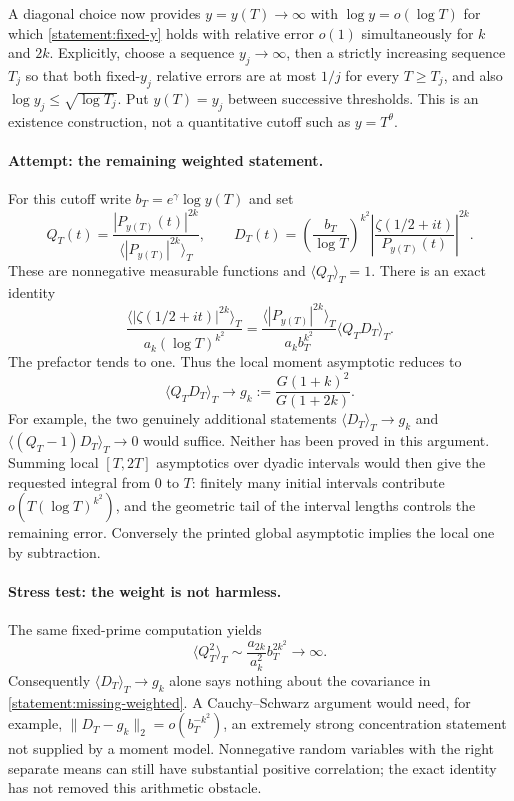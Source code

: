 \documentclass[11pt,a4paper]{article}
\numberwithin{equation}{section}
\begin{document}
A diagonal choice now provides $y=y(T)\to\infty$ with
$\log y=o(\log T)$ for which
\eqref{statement:fixed-y} holds with relative error $o(1)$ simultaneously for
$k$ and $2k$. Explicitly, choose a sequence $y_j\to\infty$, then a
strictly increasing sequence $T_j$ so that both fixed-$y_j$ relative
errors are at most $1/j$ for every $T\ge T_j$, and also
$\log y_j\le\sqrt{\log T_j}$. Put $y(T)=y_j$ between successive thresholds.
This is an existence construction, not a quantitative cutoff such as
$y=T^\theta$.

\paragraph{Attempt: the remaining weighted statement.}
For this cutoff write $b_T=e^\gamma\log y(T)$ and set
\[
 Q_T(t)=\frac{|P_{y(T)}(t)|^{2k}}
                   {\langle|P_{y(T)}|^{2k}\rangle_T},\qquad
 D_T(t)=\left(\frac{b_T}{\log T}\right)^{k^2}
          \left|\frac{\zeta(1/2+it)}{P_{y(T)}(t)}\right|^{2k}.
\]
These are nonnegative measurable functions and $\langle Q_T\rangle_T=1$.
There is an exact identity
\begin{equation}\label{statement:weighted-identity}
 \frac{\langle|\zeta(1/2+it)|^{2k}\rangle_T}
        {a_k(\log T)^{k^2}}
 =\frac{\langle|P_{y(T)}|^{2k}\rangle_T}{a_k b_T^{k^2}}
       \langle Q_TD_T\rangle_T.
\end{equation}
The prefactor tends to one. Thus the local moment asymptotic reduces to
\begin{equation}\label{statement:missing-weighted}
 \langle Q_TD_T\rangle_T\longrightarrow
 g_k:=\frac{G(1+k)^2}{G(1+2k)}.
\end{equation}
For example, the two genuinely additional statements
$\langle D_T\rangle_T\to g_k$ and
$\langle(Q_T-1)D_T\rangle_T\to0$ would suffice. Neither has been proved
in this argument. Summing local $[T,2T]$ asymptotics over dyadic intervals
would then give the requested integral from $0$ to $T$: finitely many
initial intervals contribute $o(T(\log T)^{k^2})$, and the geometric tail
of the interval lengths controls the remaining error. Conversely the
printed global asymptotic implies the local one by subtraction.

\paragraph{Stress test: the weight is not harmless.}
The same fixed-prime computation yields
\begin{equation}\label{statement:variance}
 \langle Q_T^2\rangle_T
 \sim\frac{a_{2k}}{a_k^2}b_T^{2k^2}\longrightarrow\infty.
\end{equation}
Consequently $\langle D_T\rangle_T\to g_k$ alone says nothing about the
covariance in \eqref{statement:missing-weighted}. A Cauchy--Schwarz argument
would need, for example,
$\|D_T-g_k\|_2=o(b_T^{-k^2})$, an extremely strong concentration
statement not supplied by a moment model. Nonnegative random variables
with the right separate means can still have substantial positive
correlation; the exact identity has not removed this arithmetic obstacle.
\end{document}
